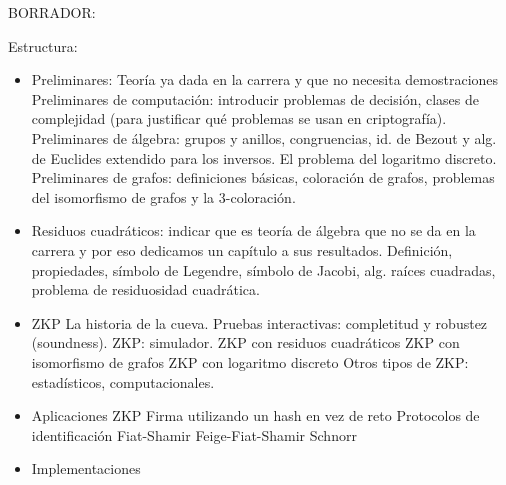 \hfil

BORRADOR:

Estructura:
\begin{itemize}
	\item Preliminares: Teoría ya dada en la carrera y que no necesita demostraciones
		\subitem Preliminares de computación: introducir problemas de decisión, clases de complejidad (para justificar qué problemas se usan en criptografía).
		\subitem Preliminares de álgebra: grupos y anillos, congruencias, id. de Bezout y alg. de Euclides extendido para los inversos. El problema del logaritmo discreto.
		\subitem Preliminares de grafos: definiciones básicas, coloración de grafos, problemas del isomorfismo de grafos y la 3-coloración.
		
	\item Residuos cuadráticos: indicar que es teoría de álgebra que no se da en la carrera y por eso dedicamos un capítulo a sus resultados.
		\subitem Definición, propiedades, símbolo de Legendre, símbolo de Jacobi, alg. raíces cuadradas, problema de residuosidad cuadrática.
		
	\item ZKP
		\subitem La historia de la cueva.
		\subitem Pruebas interactivas: completitud y robustez (soundness).
		\subitem ZKP: simulador.
			\subsubitem ZKP con residuos cuadráticos
			\subsubitem ZKP con isomorfismo de grafos
			\subsubitem ZKP con logaritmo discreto
		\subitem Otros tipos de ZKP: estadísticos, computacionales.
		
	\item Aplicaciones ZKP
		\subitem Firma utilizando un hash en vez de reto
		\subitem Protocolos de identificación
			\subsubitem Fiat-Shamir
			\subsubitem Feige-Fiat-Shamir
			\subsubitem Schnorr
			
			
	\item Implementaciones
\end{itemize}